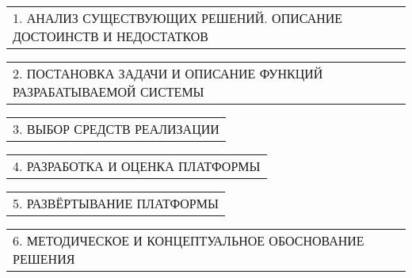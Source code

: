 \documentclass[12pt, А4, twoside]{article}
\begin{document}
\begin{FlushLeft}
    \vspace{-0.1 cm}

    \begin{tabular}{p{17.25cm}}
        \hspace{0.3cm} \textsf{1. АНАЛИЗ СУЩЕСТВУЮЩИХ РЕШЕНИЙ. ОПИСАНИЕ ДОСТОИНСТВ И НЕДОСТАТКОВ} \vspace{0pt} \hline \\
    \end{tabular}

    \vspace{-0.1 cm}

    \begin{tabular}{p{17.25cm}}
        \hspace{0.3cm} \textsf{2. ПОСТАНОВКА ЗАДАЧИ И ОПИСАНИЕ ФУНКЦИЙ РАЗРАБАТЫВАЕМОЙ СИСТЕМЫ} \vspace{0pt} \hline \\
    \end{tabular}

    \vspace{-0.1 cm}

    \begin{tabular}{p{17.25cm}}
        \hspace{0.3cm} \textsf{3. ВЫБОР СРЕДСТВ РЕАЛИЗАЦИИ} \vspace{0pt} \hline \\
    \end{tabular}

    \vspace{-0.1 cm}

    \begin{tabular}{p{17.25cm}}
        \hspace{0.3cm} \textsf{4. РАЗРАБОТКА И ОЦЕНКА ПЛАТФОРМЫ} \vspace{0pt} \hline \\
    \end{tabular}

    \vspace{-0.1 cm}

    \begin{tabular}{p{17.25cm}}
        \hspace{0.3cm} \textsf{5. РАЗВЁРТЫВАНИЕ ПЛАТФОРМЫ} \vspace{0pt} \hline \\
    \end{tabular}

    \vspace{-0.1 cm}

    \begin{tabular}{p{17.25cm}} 
        \hspace{0.3cm} \textsf{6. МЕТОДИЧЕСКОЕ И КОНЦЕПТУАЛЬНОЕ ОБОСНОВАНИЕ РЕШЕНИЯ} \vspace{1pt} \hline \\
    \end{tabular}  


\end{FlushLeft}
\end{document}

